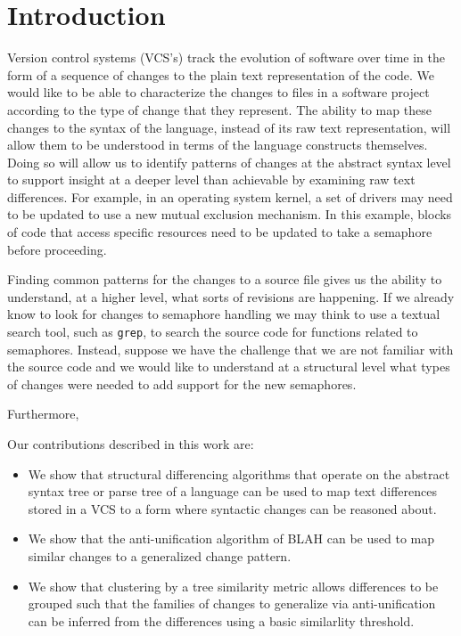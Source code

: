 \section{Introduction}

Version control systems (VCS's) track the evolution of software over time in the form
of a sequence of changes to the plain text representation of the code.
We would like to be able to characterize the changes to files in a software
project according to the type of change that they represent.  The ability to
map these changes to the syntax of the language, instead of its raw text
representation, will allow them to be understood in terms of the language
constructs themselves.  Doing so will allow us to identify patterns of
changes at the abstract syntax level to support insight at a deeper level
than achievable by examining raw text differences.  For example, in
an operating system kernel, a set of drivers may need to be updated to use a
new mutual exclusion mechanism. In this example, blocks of code that access
specific resources need to be updated to take a semaphore before proceeding.

Finding common patterns for the changes to a source file gives us the ability
to understand, at a higher level, what sorts of revisions are happening. If we
already know to look for changes to semaphore handling we may think to use a
textual search tool, such as {\tt grep}, to search the source code for
functions related to semaphores. Instead, suppose we have the challenge that we
are not familiar with the source code and we would like to understand at a
structural level what types of changes were needed to add support for the new
semaphores.

Furthermore, 



Our contributions described in this work are:

\begin{itemize}

\item We show that structural differencing algorithms that operate on the abstract
syntax tree or parse tree of a language can be used to map text differences stored in
a VCS to a form where syntactic changes can be reasoned about.

\item We show that the anti-unification algorithm of BLAH can be used to map
similar changes to a generalized change pattern.

\item We show that clustering by a tree similarity metric allows differences to be grouped
such that the families of changes to generalize via anti-unification can be inferred from
the differences using a basic similarlity threshold.

\end{itemize}

